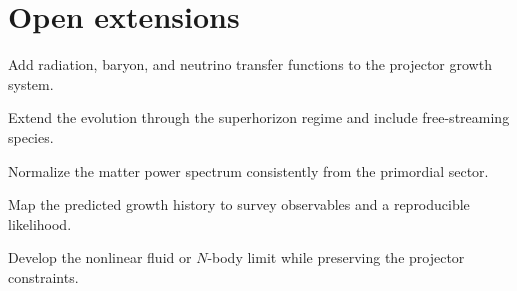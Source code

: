 \section{Open extensions}
\begin{nextsteps}
\item Add radiation, baryon, and neutrino transfer functions to the projector growth system.
\item Extend the evolution through the superhorizon regime and include free-streaming species.
\item Normalize the matter power spectrum consistently from the primordial sector.
\item Map the predicted growth history to survey observables and a reproducible likelihood.
\item Develop the nonlinear fluid or \(N\)-body limit while preserving the projector constraints.
\end{nextsteps}
